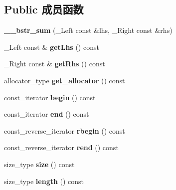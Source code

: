 \subsection*{Public 成员函数}
\begin{DoxyCompactItemize}
\item 
\mbox{\label{class____bstr__sum_a650e9e9046bf6c6006835e0259f0abc9}} 
{\bfseries \+\_\+\+\_\+bstr\+\_\+sum} (\+\_\+\+Left const \&lhs, \+\_\+\+Right const \&rhs)
\item 
\mbox{\label{class____bstr__sum_a09ac95bafede1d4c0424f2e123d76678}} 
\+\_\+\+Left const  \& {\bfseries get\+Lhs} () const
\item 
\mbox{\label{class____bstr__sum_aa6398e33cf5093cc1852bb5fba876c25}} 
\+\_\+\+Right const  \& {\bfseries get\+Rhs} () const
\item 
\mbox{\label{class____bstr__sum_a1e98d36105e68485b4a9fa83c8851291}} 
allocator\+\_\+type {\bfseries get\+\_\+allocator} () const
\item 
\mbox{\label{class____bstr__sum_ad0220635716afee8f36da09b751c0712}} 
const\+\_\+iterator {\bfseries begin} () const
\item 
\mbox{\label{class____bstr__sum_a9376250559eb0fb0c25d4de1ae207252}} 
const\+\_\+iterator {\bfseries end} () const
\item 
\mbox{\label{class____bstr__sum_a7281bea0af6455992520c89795921b86}} 
const\+\_\+reverse\+\_\+iterator {\bfseries rbegin} () const
\item 
\mbox{\label{class____bstr__sum_a3715d8ec5c2aa939f473541afc88743f}} 
const\+\_\+reverse\+\_\+iterator {\bfseries rend} () const
\item 
\mbox{\label{class____bstr__sum_a3ab273f859c677c8603f334aa1c16230}} 
size\+\_\+type {\bfseries size} () const
\item 
\mbox{\label{class____bstr__sum_a812009bad879365224c782823e547709}} 
size\+\_\+type {\bfseries length} () const

\end{DoxyCompactItemize}
